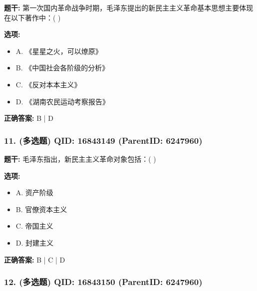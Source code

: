 \documentclass[12pt,UTF8]{ctexart}
\begin{document}
\textbf{题干:}
第一次国内革命战争时期，毛泽东提出的新民主主义革命基本思想主要体现在以下著作中：( )



\textbf{选项:}
\begin{itemize}[leftmargin=*]

  \item A. 《星星之火，可以燎原》

  \item B. 《中国社会各阶级的分析》

  \item C. 《反对本本主义》

  \item D. 《湖南农民运动考察报告》

\end{itemize}

\textbf{正确答案:}
B | D

\vspace{0.3em}\hrulefill\vspace{0.7em}

\subsubsection*{11. (多选题) \small QID: 16843149 (ParentID: 6247960)}

\textbf{题干:}
毛泽东指出，新民主主义革命对象包括：( )



\textbf{选项:}
\begin{itemize}[leftmargin=*]

  \item A. 资产阶级

  \item B. 官僚资本主义

  \item C. 帝国主义

  \item D. 封建主义

\end{itemize}

\textbf{正确答案:}
B | C | D

\vspace{0.3em}\hrulefill\vspace{0.7em}

\subsubsection*{12. (多选题) \small QID: 16843150 (ParentID: 6247960)}
\end{document}
